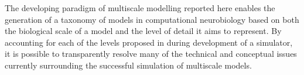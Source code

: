 \documentclass[11pt,3p,twocolumn]{JMN}
\begin{document}
The developing paradigm of multiscale modelling reported here enables the generation of a taxonomy of models in computational neurobiology
based on both the biological scale of a model and the level of detail it aims to represent. By accounting for each of the levels proposed in \cite{Marr:1982fk} during development of a simulator, it is possible to transparently resolve many of the technical and conceptual issues currently surrounding the successful simulation of multiscale models.

%
 


%

\end{document}
